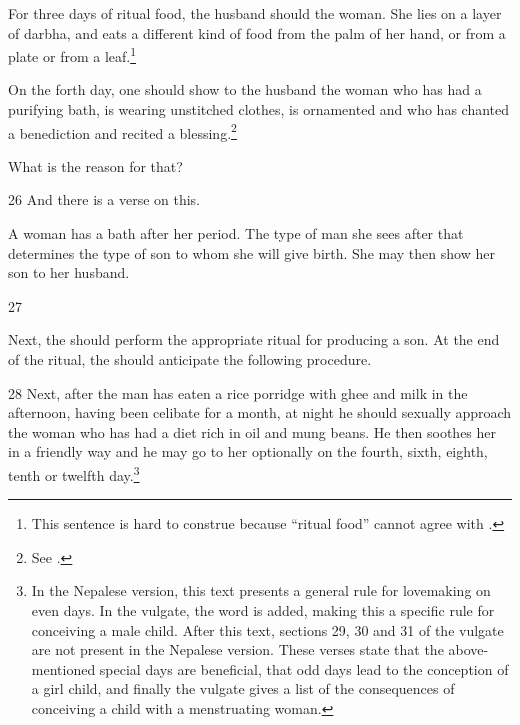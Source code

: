 \begin{translation}
For three days of ritual food, the husband should  the
woman.  She lies on a layer of \gls{darbha}, and eats a different kind of food
from the palm of her hand, or from a plate or from a leaf.\footnote{This
    sentence is hard to construe because  “ritual food” cannot 
    agree
    with .}

On the forth day, one should  show to the husband the woman 
who has
had a purifying bath, is wearing unstitched clothes, is ornamented and who has
chanted a benediction and recited a blessing.\footnote{See \cite[58 and
    fn.\,167]{wuja-2023}.}
    
    What is the reason for that?
     
     
     \item[26]
     And there is a verse on this.
     
     \begin{sloka}
         
         A woman has a bath after her period.  The type of man she sees after 
         that determines the type of son to whom she will give birth. She may then 
         show her son to her husband.     
           
     \end{sloka}
        
        \item[27]
        
\begin{sloka}
            Next, the  should perform the appropriate 
            ritual 
        for producing a son.  At the end of the ritual, the  
        should anticipate the following procedure. 
 
\end{sloka}       

\item [28] Next, after the man has eaten a rice porridge with ghee and
milk in the afternoon, having been celibate for a month, at night he
should sexually approach the woman who has had a diet rich in oil and
mung beans.  He then soothes her in a friendly way and he may go to
her optionally on the fourth, sixth, eighth, tenth or twelfth
day.\footnote{In the Nepalese version, this text presents a general
    rule for lovemaking on even days.  In the vulgate, the word
     is added, making this a specific rule for conceiving a
    male child.  After this text, sections 29, 30 and 31 of the vulgate
    are not present in the Nepalese version.  These verses state that the
    above-mentioned special days are beneficial, that odd days lead to the 
    conception of a girl child, and finally the vulgate gives a list of the 
    consequences of conceiving a child with a menstruating woman.}
        

\end{translation}
